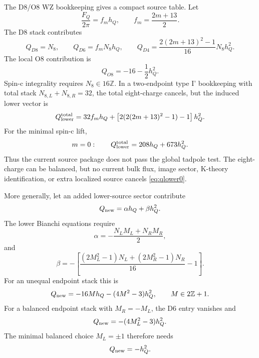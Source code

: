 \documentclass[11pt]{article}
\theoremstyle{plain}
\theoremstyle{definition}
\begin{document}
The D8/O8 WZ bookkeeping gives a compact source table.  Let
\begin{equation}
  \frac{F_Q}{2\pi}=f_mh_Q,\qquad f_m=\frac{2m+13}{2}.
\end{equation}
The D8 stack contributes
\begin{equation}
  Q_{D8}=N_8,\qquad
  Q_{D6}=f_mN_8h_Q,\qquad
  Q_{D4}=\frac{2(2m+13)^2-1}{16}N_8h_Q^2.
\end{equation}
The local O8 contribution is
\begin{equation}
  Q_{O8}=-16-\frac12h_Q^2.
\end{equation}
Spin-c integrality requires \(N_8\in16\mathbb Z\).  In a two-endpoint type I'
bookkeeping with total stack \(N_{8,L}+N_{8,R}=32\), the total eight-charge
cancels, but the induced lower vector is
\begin{equation}
  Q_{\rm lower}^{\rm total}
  =
  32f_mh_Q+
  \left[2(2(2m+13)^2-1)-1\right]h_Q^2.
  \label{eq:qlower}
\end{equation}
For the minimal spin-c lift,
\begin{equation}
  m=0:\qquad Q_{\rm lower}^{\rm total}=208h_Q+673h_Q^2.
  \label{eq:qlower0}
\end{equation}
Thus the current source package does not pass the global tadpole test.  The
eight-charge can be balanced, but no current bulk flux, image sector, K-theory
identification, or extra localized source cancels \eqref{eq:qlower0}.

More generally, let an added lower-source sector contribute
\begin{equation}
  Q_{\rm new}=\alpha h_Q+\beta h_Q^2 .
  \label{eq:qnew}
\end{equation}
The lower Bianchi equations require
\begin{equation}
  \alpha=-\frac{N_LM_L+N_RM_R}{2},
  \label{eq:alpha-target}
\end{equation}
and
\begin{equation}
  \beta=
  -\left[
  \frac{(2M_L^2-1)N_L+(2M_R^2-1)N_R}{16}-1
  \right].
  \label{eq:beta-target}
\end{equation}
For an unequal endpoint stack this is
\begin{equation}
  Q_{\rm new}=-16M h_Q-(4M^2-3)h_Q^2 ,
  \qquad M\in2\mathbb Z+1.
  \label{eq:unequal-source-target}
\end{equation}
For a balanced endpoint stack with \(M_R=-M_L\), the D6 entry vanishes and
\begin{equation}
  Q_{\rm new}=-(4M_L^2-3)h_Q^2 .
  \label{eq:balanced-source-target}
\end{equation}
The minimal balanced choice \(M_L=\pm1\) therefore needs
\begin{equation}
  Q_{\rm new}=-h_Q^2 .
  \label{eq:min-source-target}
\end{equation}
\end{document}
